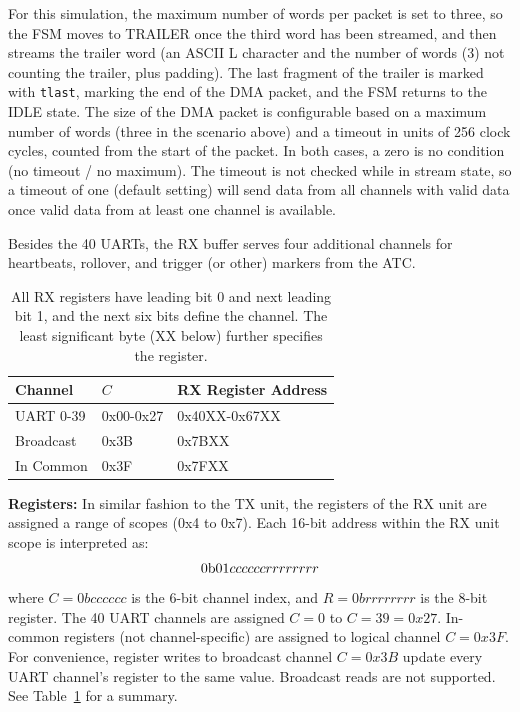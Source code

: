 \documentclass[12pt]{article}
\begin{document}
For this simulation, the maximum number of words per packet is set to
three, so the FSM moves to TRAILER once the third word has been
streamed, and then streams the trailer word (an ASCII L character and
the number of words (3) not counting the trailer, plus padding).  The
last fragment of the trailer is marked with {\tt tlast}, marking the
end of the DMA packet, and the FSM returns to the IDLE state.  The
size of the DMA packet is configurable based on a maximum number of
words (three in the scenario above) and a timeout in units of 256
clock cycles, counted from the start of the packet.  In both cases, a
zero is no condition (no timeout / no maximum).  The timeout is not
checked while in stream state, so a
timeout of one (default setting) will send data from all channels with
valid data once valid data from at least one channel is available.

Besides the 40 UARTs, the RX buffer serves four additional channels
for heartbeats, rollover, and trigger (or other) markers from the ATC.

\begin{table}
\caption{\label{tbl:rx-scope} All RX registers have leading bit 0 and next leading bit 1, and the next six bits define the channel.  The least significant byte (XX below) further specifies the register.}
\begin{center}
\begin{tabular}{|lll|}
\hline
Channel      & $C$                   & RX Register Address       \\
\hline
UART 0-39    & 0{\rm x}00-0{\rm x}27 & 0{\rm x}40XX-0{\rm x}67XX \\
Broadcast    & 0{\rm x}3B            & 0{\rm x}7BXX              \\
In Common    & 0{\rm x}3F            & 0{\rm x}7FXX              \\
\hline
\end{tabular}
\end{center}
\end{table}

{\bf Registers:} In similar fashion to the TX unit, the registers of
the RX unit are assigned a range of scopes (0x4 to 0x7).  Each 16-bit
address within the RX unit scope is interpreted as:
$${\rm 0b01}cc cccc rrrr rrrr$$
where $C=0bcc cccc$ is the 6-bit channel index, and $R=0brrrr rrrr$ is
the 8-bit register.  The 40 UART channels are assigned $C=0$ to
$C=39=0x27$.  In-common registers (not channel-specific) are assigned
to logical channel $C=0x3F$.  For convenience, register writes to
broadcast channel $C=0x3B$ update every UART channel's register to the
same value.  Broadcast reads are not supported. See
Table~\ref{tbl:rx-scope} for a summary.
\end{document}
